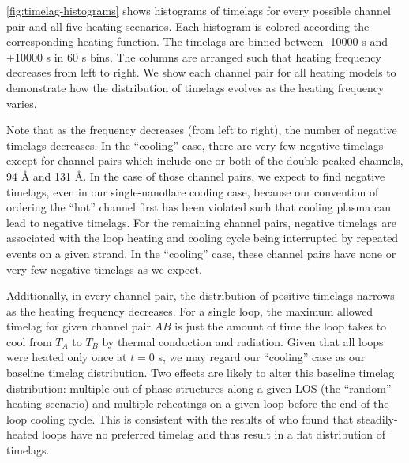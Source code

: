 \autoref{fig:timelag-histograms} shows histograms of timelags for every possible channel pair and all five heating scenarios. Each histogram is colored according the corresponding heating function. The timelags are binned between -10000 s and +10000 s in 60 s bins. The columns are arranged such that heating frequency decreases from left to right. We show each channel pair for all heating models to demonstrate how the distribution of timelags evolves as the heating frequency varies.

Note that as the frequency decreases (from left to right), the number of negative timelags decreases. In the ``cooling'' case, there are very few negative timelags except for channel pairs which include one or both of the double-peaked channels, 94 \AA{} and 131 \AA{}. In the case of those channel pairs, we expect to find negative timelags, even in our single-nanoflare cooling case, because our convention of ordering the ``hot'' channel first has been violated such that cooling plasma can lead to negative timelags. For the remaining channel pairs, negative timelags are associated with the loop heating and cooling cycle being interrupted by repeated events on a given strand. In the ``cooling'' case, these channel pairs have none or very few negative timelags as we expect. 

Additionally, in every channel pair, the distribution of positive timelags narrows as the heating frequency decreases. For a single loop, the maximum allowed timelag for given channel pair $AB$ is just the amount of time the loop takes to cool from $T_A$ to $T_B$ by thermal conduction and radiation. Given that all loops were heated only once at $t=0$ s, we may regard our ``cooling'' case as our baseline timelag distribution. Two effects are likely to alter this baseline timelag distribution: multiple out-of-phase structures along a given LOS (the ``random'' heating scenario) and multiple reheatings on a given loop before the end of the loop cooling cycle.  This is consistent with the results of \citet{viall_signatures_2016} who found that steadily-heated loops have no preferred timelag and thus result in a flat distribution of timelags. 

